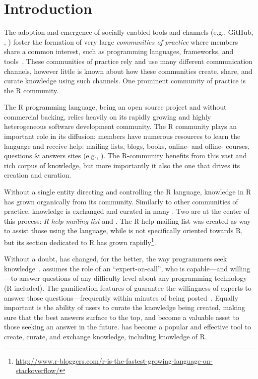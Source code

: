 \section{Introduction}
\label{cha:introduction}
The adoption and emergence of socially enabled tools and channels (e.g., GitHub, \SO, \ml) foster the formation of very large \textit{communities of practice} where members share a common interest, such as programming languages, frameworks, and tools~\cite{Storey2014}. These communities of practice rely and use many different communication channels, however little is known about how these communities create, share, and curate knowledge using such channels. One prominent community of practice is the R community.

The R programming language, being an open source project and without commercial backing, relies heavily on its rapidly growing and highly heterogeneous software development community. The R community plays an important role in its diffusion; members have numerous resources to learn the language and receive help: mailing lists, blogs, books, online- and offine- courses, questions \& answers sites (e.g., \SO). The R-community benefits from this vast and rich corpus of knowledge, but more importantly it also the one that drives its creation and curation.

Without a single entity directing and controlling the R language, knowledge in R has grown organically from its community. Similarly to other communities of practice, knowledge is exchanged and curated in many \channels. Two \channels are at the center of this process: \textit{R-help mailing list} and \textit{\SO}. The R-help mailing list was created as way to assist those using the language, while \SO is not specifically oriented towards R, but its section dedicated to R has grown rapidly\footnote{\href{http://www.r-bloggers.com/r-is-the-fastest-growing-language-on-stackoverflow/}{http://www.r-bloggers.com/r-is-the-fastest-growing-language-on-stackoverflow/}}.

Without a doubt, \SO has changed, for the better, the way programmers seek knowledge~\cn. \SO assumes the role of an ``expert-on-call'', who is capable---and willing---to answer questions of any difficulty level about any programming technology (R included). The gamification features of \SO guarantee the willingness of experts to answer those questions---frequently within minutes of being posted~\cite{Mamykina2011}. Equally important is the ability of \SO users to curate the knowledge being created, making sure that the best answers surface to the top, and become a valuable asset to those seeking an answer in the future. \SO has become a popular and effective tool to create, curate, and exchange knowledge, including knowledge of R.

